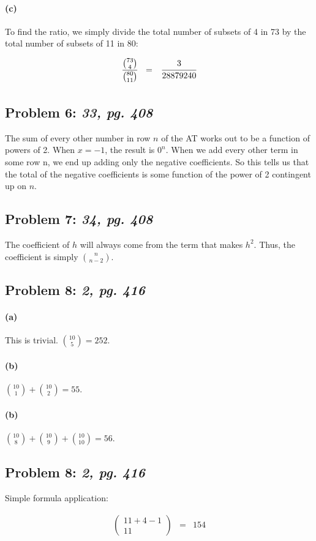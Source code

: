 \documentclass[a4paper]{article}
\begin{document}
\paragraph{(c)} To find the ratio, we simply divide the total number of subsets of 4 in 73 by the total number of subsets of 11 in 80:

\begin{equation}
\begin{array}{rll}
\cfrac{{73 \choose 4}}{{80 \choose 11}} & = & \cfrac{3}{28879240} \\[.15in]
\end{array}
\end{equation}

\subsection*{Problem 6: \textit{33, pg. 408}} The sum of every other number in row $n$ of the AT works out to be a function of powers of 2. When $x = -1$, the result is $0^n$. When we add every other term in some row n, we end up adding only the negative coefficients. So this tells us that the total of the negative coefficients is some function of the power of 2 contingent up on $n$.

\subsection*{Problem 7: \textit{34, pg. 408}} The coefficient of $h$ will always come from the term that makes $h^2$. Thus, the coefficient is simply $n \choose n-2$.

\subsection*{Problem 8: \textit{2, pg. 416}}

\paragraph{(a)} This is trivial. ${10 \choose 5} = 252$.

\paragraph{(b)} ${10 \choose 1} + {10 \choose 2} = 55$.

\paragraph{(b)} ${10 \choose 8} + {10 \choose 9} + {10 \choose 10} = 56$.

\subsection*{Problem 8: \textit{2, pg. 416}} Simple formula application:

\begin{equation}
\begin{array}{rll}
\left ( \begin{array}{c} 11 + 4 - 1 \\ 11 \end{array} \right ) & = & 154 \\[.15in]
\end{array}
\end{equation}
\end{document}

